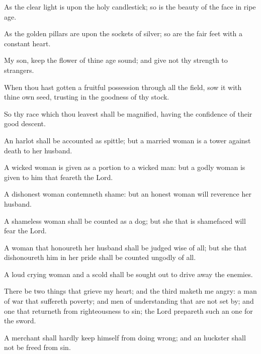 {\par }{\PP {}As the clear light is upon the holy candlestick; so is the beauty of the face in ripe age.
\par }{\PP {}As the golden pillars are upon the sockets of silver; so are the fair feet with a constant heart.
\par }{\PP {}My son, keep the flower of thine age sound; and give not thy strength to strangers.
\par }{\PP {}When thou hast gotten a fruitful possession through all the field, sow it with thine own seed, trusting in the goodness of thy stock.
\par }{\PP {}So thy race which thou leavest shall be magnified, having the confidence of their good descent.
\par }{\PP {}An harlot shall be accounted as spittle; but a married woman is a tower against death to her husband.
\par }{\PP {}A wicked woman is given as a portion to a wicked man: but a godly woman is given to him that feareth the Lord.
\par }{\PP {}A dishonest woman contemneth shame: but an honest woman will reverence her husband.
\par }{\PP {}A shameless woman shall be counted as a dog; but she that is shamefaced will fear the Lord.
\par }{\PP {}A woman that honoureth her husband shall be judged wise of all; but she that dishonoureth him in her pride shall be counted ungodly of all.
\par }{\PP {}A loud crying woman and a scold shall be sought out to drive away the enemies.
\par }{\PP {}There be two things that grieve my heart; and the third maketh me angry: a man of war that suffereth poverty; and men of understanding that are not set by; and one that returneth from righteousness to sin; the Lord prepareth such an one for the sword.
\par }{\PP {}A merchant shall hardly keep himself from doing wrong; and an huckster shall not be freed from sin.

}
